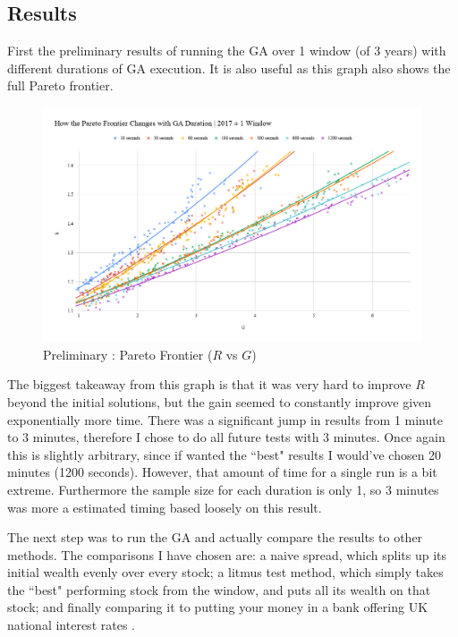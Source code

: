 \documentclass[11pt]{article}
\begin{document}
\subsection{Results}

    First the preliminary results of running the GA over 1 window (of 3 years) with different
    durations of GA execution. It is also useful as this graph also shows
    the full Pareto frontier.

    \begin{figure}[H] %
        \includegraphics[width=\textwidth]{HowTheParetoFrontierChangesWithGADuration_2017-1Window}
        \caption{Preliminary : Pareto Frontier (\(R\) vs \(G\))}
            \label{fig:HowTheParetoFrontierChangesWithGADuration_2017-1Window}
    \end{figure}

    The biggest takeaway from this graph is that it was very hard to improve \(R\) beyond
    the initial solutions, but the gain seemed to constantly improve given exponentially
    more time. There was a significant jump in results from 1 minute to 3 minutes,
    therefore I chose to do all future tests with 3 minutes. Once again this is slightly
    arbitrary, since if wanted the ``best" results I would've chosen 20 minutes (1200 seconds).
    However, that amount of time for a single run is a bit extreme. Furthermore the sample size for
    each duration is only 1, so 3 minutes was more a estimated timing based loosely
    on this result.

    The next step was to run the GA and actually compare the results to other methods.
    The comparisons I have chosen are: a naive spread, which splits up its initial wealth
    evenly over every stock; a litmus test method, which simply takes the ``best" performing
    stock from the window, and puts all its wealth on that stock; and finally
    comparing it to putting your money in a bank offering UK national interest rates
    \cite{BankOfE}.
\end{document}
